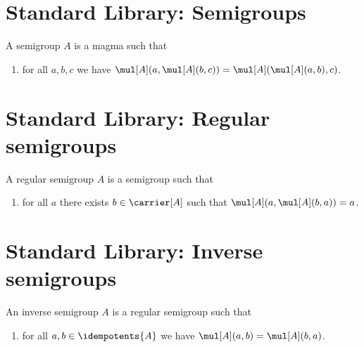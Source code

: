 \section{Standard Library: Semigroups}

\begin{struct}\label{semigroup}
    A semigroup $A$ is a magma such that
    \begin{enumerate}
        \item\label{semigroup_assoc} for all $a, b, c$ we have $\mul[A](a,\mul[A](b,c)) = \mul[A](\mul[A](a,b),c)$.
    \end{enumerate}
\end{struct}



\section{Standard Library: Regular semigroups}


\begin{struct}\label{regularsemigroup}
    A regular semigroup $A$ is a semigroup such that
    \begin{enumerate}
        \item\label{regularsemigroup_regular} for all $a$ there exists $b\in\carrier[A]$ such that $\mul[A](a, \mul[A](b, a)) = a$.
    \end{enumerate}
\end{struct}



\section{Standard Library: Inverse semigroups}

\begin{struct}\label{inversesemigroup}
    An inverse semigroup $A$ is a regular semigroup such that
    \begin{enumerate}
        \item\label{inversesemigroup_comm} for all $a,b\in\idempotents{A}$ we have $\mul[A](a, b) = \mul[A](b, a)$.
    \end{enumerate}
\end{struct}

